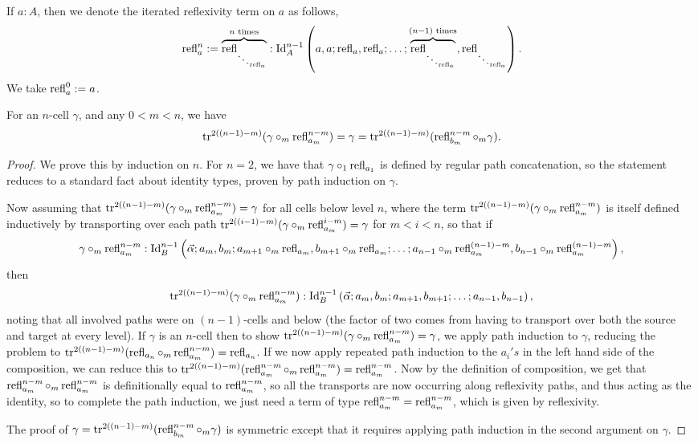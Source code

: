 \documentclass{article}
\begin{document}
\begin{notn}
    If $a:A$, then we denote the iterated reflexivity term on $a$ as follows,
    $$ \operatorname{refl}^n_a:=\overbrace{\operatorname{refl}_{\ddots_{\operatorname{refl}_a}}}^{n\text{ times}}:\operatorname{Id}^{n-1}_A\left(a,a;\operatorname{refl}_a,\operatorname{refl}_a;\dots;\overbrace{\operatorname{refl}_{\ddots_{\operatorname{refl}_a}}}^{(n-1)\text{ times}},\operatorname{refl}_{\ddots_{\operatorname{refl}_a}}\right). $$
    We take $\operatorname{refl}^0_a:=a$.
\end{notn}

\begin{prop}\label{prop:unit}
    For an $n$-cell $\gamma$, and any $0<m<n$, we have
    $$ \operatorname{tr}^{2((n-1)-m)}(\gamma\circ_m\operatorname{refl}^{n-m}_{a_m})=\gamma=\operatorname{tr}^{2((n-1)-m)}(\operatorname{refl}^{n-m}_{b_m}\circ_m\gamma). $$
\end{prop}
\begin{proof}
    We prove this by induction on $n$. For $n=2$, we have that $\gamma\circ_1\operatorname{refl}_{a_1}$ is defined by regular path concatenation, so the statement reduces to a standard fact about identity types, proven by path induction on $\gamma$.

    Now assuming that $\operatorname{tr}^{2((n-1)-m)}(\gamma\circ_m\operatorname{refl}^{n-m}_{a_m})=\gamma$ for all cells below level $n$, where the term $\operatorname{tr}^{2((n-1)-m)}(\gamma\circ_m\operatorname{refl}^{n-m}_{a_m})$ is itself defined inductively by transporting over each path $\operatorname{tr}^{2((i-1)-m)}(\gamma\circ_m\operatorname{refl}^{i-m}_{a_m})=\gamma$ for $m<i<n$, so that if
    $$ \gamma\circ_m\operatorname{refl}^{n-m}_{a_m}:\operatorname{Id}_B^{n-1}\left(\vec{\alpha};a_m,b_m;a_{m+1}\circ_m\operatorname{refl}_{a_m},b_{m+1}\circ_m\operatorname{refl}_{a_m};\dots;a_{n-1}\circ_m\operatorname{refl}_{a_m}^{(n-1)-m},b_{n-1}\circ_m\operatorname{refl}_{a_m}^{(n-1)-m}\right), $$
    then
    $$ \operatorname{tr}^{2((n-1)-m)}(\gamma\circ_m\operatorname{refl}^{n-m}_{a_m}):\operatorname{Id}_B^{n-1}\left(\vec{\alpha};a_m,b_m;a_{m+1},b_{m+1};\dots;a_{n-1},b_{n-1}\right), $$
    noting that all involved paths were on $(n-1)$-cells and below (the factor of two comes from having to transport over both the source and target at every level). If $\gamma$ is an $n$-cell then to show $\operatorname{tr}^{2((n-1)-m)}(\gamma\circ_m\operatorname{refl}^{n-m}_{a_m})=\gamma$, we apply path induction to $\gamma$, reducing the problem to $\operatorname{tr}^{2((n-1)-m)}(\operatorname{refl}_{a_n}\circ_m\operatorname{refl}^{n-m}_{a_m})=\operatorname{refl}_{a_n}$. If we now apply repeated path induction to the $a_i's$ in the left hand side of the composition, we can reduce this to $\operatorname{tr}^{2((n-1)-m)}(\operatorname{refl}^{n-m}_{a_m}\circ_m\operatorname{refl}^{n-m}_{a_m})=\operatorname{refl}^{n-m}_{a_m}$. Now by the definition of composition, we get that $\operatorname{refl}^{n-m}_{a_m}\circ_m\operatorname{refl}^{n-m}_{a_m}$ is definitionally equal to $\operatorname{refl}^{n-m}_{a_m}$, so all the transports are now occurring along reflexivity paths, and thus acting as the identity, so to complete the path induction, we just need a term of type $\operatorname{refl}^{n-m}_{a_m}=\operatorname{refl}^{n-m}_{a_m}$, which is given by reflexivity.

    The proof of $\gamma=\operatorname{tr}^{2((n-1)-m)}(\operatorname{refl}^{n-m}_{b_m}\circ_m\gamma)$ is symmetric except that it requires applying path induction in the second argument on $\gamma$. %
\end{proof}
\end{document}
